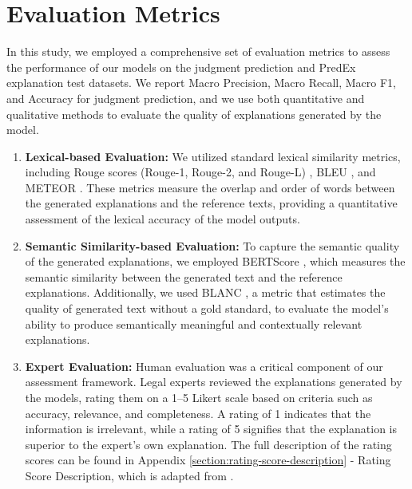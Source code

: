 \section{Evaluation Metrics}
\label{sec:performance_metrics}

In this study, we employed a comprehensive set of evaluation metrics to assess the performance of our models on the \named judgment prediction and PredEx explanation test datasets. We report Macro Precision, Macro Recall, Macro F1, and Accuracy for judgment prediction, and we use both quantitative and qualitative methods to evaluate the quality of explanations generated by the model.

\begin{enumerate}
    \item \textbf{Lexical-based Evaluation:} We utilized standard lexical similarity metrics, including Rouge scores (Rouge-1, Rouge-2, and Rouge-L) \cite{lin-2004-rouge}, BLEU \cite{papineni-etal-2002-bleu}, and METEOR \cite{banerjee-lavie-2005-meteor}. These metrics measure the overlap and order of words between the generated explanations and the reference texts, providing a quantitative assessment of the lexical accuracy of the model outputs.

    \item \textbf{Semantic Similarity-based Evaluation:} To capture the semantic quality of the generated explanations, we employed BERTScore \cite{BERTScore}, which measures the semantic similarity between the generated text and the reference explanations. Additionally, we used BLANC \cite{blanc}, a metric that estimates the quality of generated text without a gold standard, to evaluate the model's ability to produce semantically meaningful and contextually relevant explanations.
    
    \item \textbf{Expert Evaluation:} Human evaluation was a critical component of our assessment framework. Legal experts reviewed the explanations generated by the models, rating them on a 1–5 Likert scale based on criteria such as accuracy, relevance, and completeness. A rating of 1 indicates that the information is irrelevant, while a rating of 5 signifies that the explanation is superior to the expert's own explanation. The full description of the rating scores can be found in Appendix \ref{section:rating-score-description} - Rating Score Description, which is adapted from \cite{nigam2024legaljudgmentreimaginedpredex}.

\end{enumerate}
